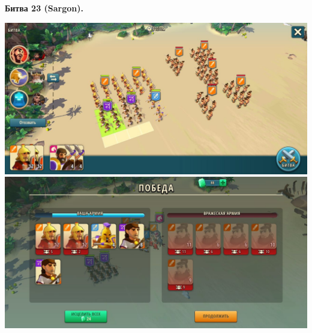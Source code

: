 \newpage
\begin{center}
	\hypertarget{fight23}{\textbf{Битва 23 (Sargon).}}
\end{center}
\noindent\includegraphics[width=\linewidth]{./parts/media/TreasureHunt/23/sargon/photo_2022-04-06_18-12-18.jpg} \newline
\noindent\includegraphics[width=\linewidth]{./parts/media/TreasureHunt/23/sargon/photo_2022-04-06_18-12-26.jpg} \newline

